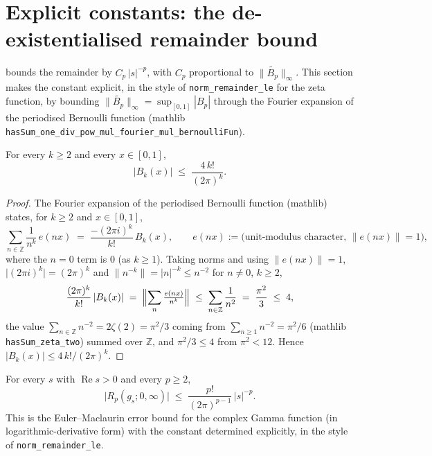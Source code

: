\section{Explicit constants: the de-existentialised remainder bound}
\label{sec:gs_explicit}

 bounds the remainder by $C_{p}\,|s|^{-p}$, with $C_p$
proportional to $\|\widetilde{B_p}\|_\infty$. This section makes the constant explicit, in
the style of \texttt{norm\_remainder\_le} for the zeta function, by bounding
$\|\widetilde{B_p}\|_\infty=\sup_{[0,1]}|B_p|$ through the Fourier expansion
of the periodised Bernoulli function (mathlib
\texttt{hasSum\_one\_div\_pow\_mul\_fourier\_mul\_bernoulliFun}).

\begin{lemma}
\label{lem:gs_bernoulli_sup}
\leanok
For every $k\ge2$ and every $x\in[0,1]$,
\[
  \bigl|B_k(x)\bigr| \;\le\; \frac{4\,k!}{(2\pi)^{k}} .
\]
\end{lemma}

\begin{proof}
\leanok
The Fourier expansion of the periodised Bernoulli function (mathlib) states, for $k\ge2$ and
$x\in[0,1]$,
\[
  \sum_{n\in\mathbb Z}\frac{1}{n^{k}}\,e(nx)
  \;=\; \frac{-(2\pi i)^{k}}{k!}\,B_k(x),
  \qquad e(nx):=\text{(unit-modulus character, }\|e(nx)\|=1),
\]
where the $n=0$ term is $0$ (as $k\ge1$). Taking norms and using $\|e(nx)\|=1$,
$\bigl|(2\pi i)^k\bigr|=(2\pi)^k$ and $\|n^{-k}\|=|n|^{-k}\le n^{-2}$ for $n\neq0$, $k\ge2$,
\[
  \frac{(2\pi)^{k}}{k!}\,|B_k(x)|
  \;=\;\Bigl\|\sum_{n}\tfrac{e(nx)}{n^{k}}\Bigr\|
  \;\le\;\sum_{n\in\mathbb Z}\frac{1}{n^{2}}
  \;=\;\frac{\pi^{2}}{3}\;\le\;4 ,
\]
the value $\sum_{n\in\mathbb Z}n^{-2}=2\zeta(2)=\pi^2/3$ coming from
$\sum_{n\ge1}n^{-2}=\pi^2/6$ (mathlib \texttt{hasSum\_zeta\_two}) summed over $\mathbb Z$, and
$\pi^2/3\le4$ from $\pi^2<12$. Hence $|B_k(x)|\le 4\,k!/(2\pi)^k$.
\end{proof}

\begin{theorem}
\label{thm:gs_remainder_bound_explicit}
\leanok
{}
For every $s$ with $\operatorname{Re}s>0$ and every $p\ge2$,
\[
  \bigl|R_p(g_s;0,\infty)\bigr|
  \;\le\; \frac{p!}{(2\pi)^{p-1}}\,\lvert s\rvert^{-p} .
\]
This is the Euler--Maclaurin error bound for the complex Gamma function (in logarithmic-derivative
form) with the constant determined explicitly, in the style of \texttt{norm\_remainder\_le}.
\end{theorem}

